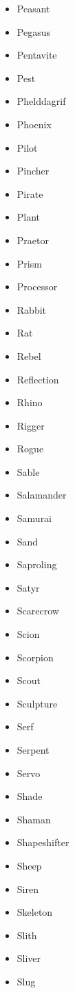 \documentclass{article}
\begin{document}
\begin{multicols}{3}
\begin{itemize}
        \item Peasant
        \item Pegasus
        \item Pentavite
        \item Pest
        \item Phelddagrif
        \item Phoenix
        \item Pilot
        \item Pincher
        \item Pirate
        \item Plant
        \item Praetor
        \item Prism
        \item Processor
        \item Rabbit
        \item Rat
        \item Rebel
        \item Reflection
        \item Rhino
        \item Rigger
        \item Rogue
        \item Sable
        \item Salamander
        \item Samurai
        \item Sand
        \item Saproling
        \item Satyr
        \item Scarecrow
        \item Scion
        \item Scorpion
        \item Scout
        \item Sculpture
        \item Serf
        \item Serpent
        \item Servo
        \item Shade
        \item Shaman
        \item Shapeshifter
        \item Sheep
        \item Siren
        \item Skeleton
        \item Slith
        \item Sliver
        \item Slug

\end{itemize}
\end{multicols}
\end{document}
